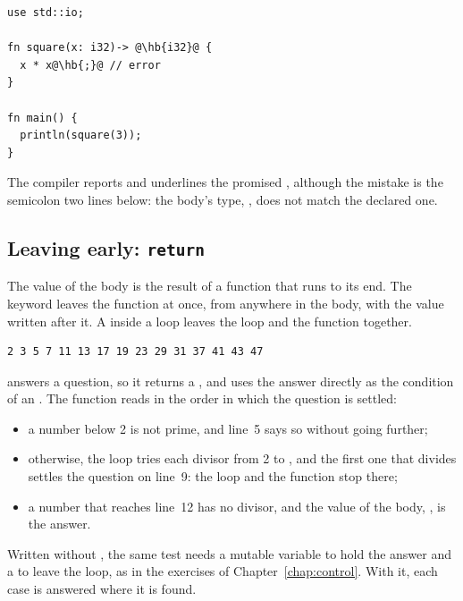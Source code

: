 \begin{lstlisting}[style=coloredverbatimError, escapechar=@, caption=A body with no value]
use std::io;

fn square(x: i32)-> @\hb{i32}@ {
  x * x@\hb{;}@ // error
}

fn main() {
  println(square(3));
}
\end{lstlisting}

The compiler reports  and underlines the
promised , although the mistake is the semicolon two lines below: the
body's type, , does not match the declared one.

\subsection{Leaving early: \texttt{return}}

The value of the body is the result of a function that runs to its end. The
keyword  leaves the function at once, from anywhere in the body,
with the value written after it. A  inside a loop leaves the loop
and the function together.


\vspace{-10pt}%
\begin{lstlisting}[style=bashVerb]
2 3 5 7 11 13 17 19 23 29 31 37 41 43 47
\end{lstlisting}

 answers a question, so it returns a , and
 uses the answer directly as the condition of an . The
function reads in the order in which the question is settled:

\begin{itemize}
\item a number below 2 is not prime, and line~5 says so without going further;
\item otherwise, the loop tries each divisor from 2 to , and the
  first one that divides  settles the question on line~9: the loop and
  the function stop there;
\item a number that reaches line~12 has no divisor, and the value of the body,
  , is the answer.
\end{itemize}

Written without , the same test needs a mutable variable to hold
the answer and a  to leave the loop, as in the exercises of
Chapter~\ref{chap:control}. With it, each case is answered where it is found.

